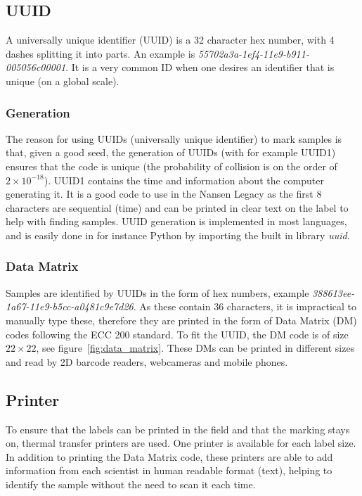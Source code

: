 \documentclass[a4paper,english, 11pt]{article}
\begin{document}
\subsection{UUID} %
\label{sub:UUID}

A universally unique identifier (UUID) is a 32 character hex number, with 4 dashes splitting it into parts. An example is \emph{55702a3a-1ef4-11e9-b911-005056c00001}. It is a very common ID when one desires an identifier that is unique (on a global scale).

\subsubsection{Generation} %
\label{ssub:Generation}

The reason for using UUIDs (universally unique identifier) to mark samples is that, given a good seed, the generation of UUIDs (with for example UUID1) ensures that the code is unique (the probability of collision is on the order of $ 2\times10^{-18}$). UUID1 contains the time and information about the computer generating it. It is a good code to use in the Nansen Legacy as the first 8 characters are sequential (time) and can be printed in clear text on the label to help with finding samples. UUID generation is implemented in most languages, and is easily done in for instance Python by importing the built in library \emph{uuid}. 


\subsubsection{Data Matrix} %
\label{ssub:DM}
Samples are identified by UUIDs in the form of hex numbers, example \emph{388613ee-1a67-11e9-b5cc-a0481c9e7d26}. As these contain 36 characters, it is impractical to manually type these, therefore they are printed in the form of  Data Matrix (DM) codes following the ECC 200 standard. To fit the UUID, the DM code is of size $22\times22$, see figure~\ref{fig:data_matrix}. These DMs can be printed in different sizes and read by 2D barcode readers, webcameras and mobile phones. 



\subsection{Printer} %
\label{sub:Printer}
To ensure that the labels can be printed in the field and that the marking stays on, thermal transfer printers are used. One printer is available for each label size. In addition to printing the Data Matrix code, these printers are able to add information from each scientist in human readable format (text), helping to identify the sample without the need to scan it each time.
\end{document}
